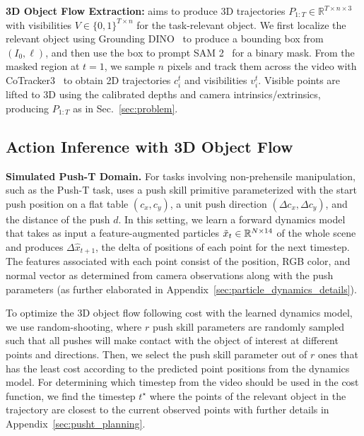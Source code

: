 \textbf{3D Object Flow Extraction:} \flow aims to produce 3D trajectories $P_{1:T}\!\in\!\mathbb{R}^{T \times n \times 3}$ with visibilities $V\!\in\!\{0,1\}^{T\times n}$ for the task-relevant object. We first localize the relevant object using Grounding DINO~\cite{liu2023grounding} to produce a bounding box from $(I_0,\ell)$, and then use the box to prompt SAM 2~\cite{ravi2024sam2} for a binary mask. From the masked region at $t{=}1$, we sample $n$ pixels and track them across the video with CoTracker3~\cite{karaev2024cotracker3} to obtain 2D trajectories $c_i^t$ and visibilities $v_i^t$. Visible points are lifted to 3D using the calibrated depths and camera intrinsics/extrinsics, producing $P_{1:T}$ as in Sec.~\ref{sec:problem}.

\subsection{Action Inference with 3D Object Flow}
\label{sec:planning}

\textbf{Simulated Push-T Domain.} For tasks involving non-prehensile manipulation, such as the Push-T task, \algo uses a push skill primitive parameterized with the start push position on a flat table $(c_x, c_y)$, a unit push direction $(\Delta c_x, \Delta c_y)$, and the distance of the push $d$. In this setting, we learn a forward dynamics model that takes as input a feature-augmented particles $\Tilde{x}_t \in \mathbb{R}^{N \times 14}$ of the whole scene and produces $\Delta \hat{x}_{t+1}$, the delta of positions of each point for the next timestep. The features associated with each point consist of the position, RGB color, and normal vector as determined from camera observations along with the push parameters (as further elaborated in Appendix~\ref{sec:particle_dynamics_details}).

To optimize the 3D object flow following cost with the learned dynamics model, we use random-shooting, where $r$ push skill parameters are randomly sampled such that all pushes will make contact with the object of interest at different points and directions. Then, we select the push skill parameter out of $r$ ones that has the least cost according to the predicted point positions from the dynamics model. For determining which timestep from the video should be used in the cost function, we find the timestep $t^{\star}$ where the points of the relevant object in the trajectory are closest to the current observed points with further details in Appendix~\ref{sec:pusht_planning}.


